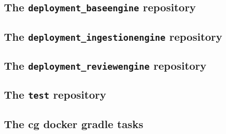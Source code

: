		\subsection{The \texttt{deployment\_baseengine} repository}
		\subsection{The \texttt{deployment\_ingestionengine} repository}
		\subsection{The \texttt{deployment\_reviewengine} repository}
		\subsection{The \texttt{test} repository}
		\subsection{The cg docker gradle tasks}